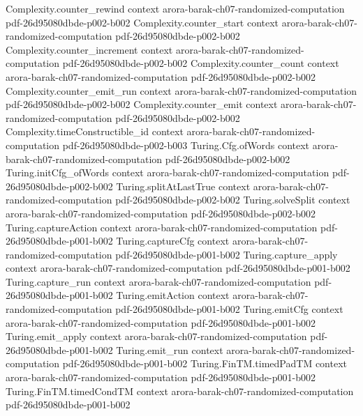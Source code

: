 \begin{theorem}
  {Complexity.counter_rewind}
  {context}
  {arora-barak-ch07-randomized-computation}
  {pdf-26d95080dbde-p002-b002}
\proofstep
  {Complexity.counter_start}
  {context}
  {arora-barak-ch07-randomized-computation}
  {pdf-26d95080dbde-p002-b002}
\proofstep
  {Complexity.counter_increment}
  {context}
  {arora-barak-ch07-randomized-computation}
  {pdf-26d95080dbde-p002-b002}
\proofstep
  {Complexity.counter_count}
  {context}
  {arora-barak-ch07-randomized-computation}
  {pdf-26d95080dbde-p002-b002}
\proofstep
  {Complexity.counter_emit_run}
  {context}
  {arora-barak-ch07-randomized-computation}
  {pdf-26d95080dbde-p002-b002}
\proofstep
  {Complexity.counter_emit}
  {context}
  {arora-barak-ch07-randomized-computation}
  {pdf-26d95080dbde-p002-b002}
\proofstep
  {Complexity.timeConstructible_id}
  {context}
  {arora-barak-ch07-randomized-computation}
  {pdf-26d95080dbde-p002-b003}
\proofstep
  {Turing.Cfg.ofWords}
  {context}
  {arora-barak-ch07-randomized-computation}
  {pdf-26d95080dbde-p002-b002}
\proofstep
  {Turing.initCfg_ofWords}
  {context}
  {arora-barak-ch07-randomized-computation}
  {pdf-26d95080dbde-p002-b002}
\proofstep
  {Turing.splitAtLastTrue}
  {context}
  {arora-barak-ch07-randomized-computation}
  {pdf-26d95080dbde-p002-b002}
\proofstep
  {Turing.solveSplit}
  {context}
  {arora-barak-ch07-randomized-computation}
  {pdf-26d95080dbde-p002-b002}
\proofstep
  {Turing.captureAction}
  {context}
  {arora-barak-ch07-randomized-computation}
  {pdf-26d95080dbde-p001-b002}
\proofstep
  {Turing.captureCfg}
  {context}
  {arora-barak-ch07-randomized-computation}
  {pdf-26d95080dbde-p001-b002}
\proofstep
  {Turing.capture_apply}
  {context}
  {arora-barak-ch07-randomized-computation}
  {pdf-26d95080dbde-p001-b002}
\proofstep
  {Turing.capture_run}
  {context}
  {arora-barak-ch07-randomized-computation}
  {pdf-26d95080dbde-p001-b002}
\proofstep
  {Turing.emitAction}
  {context}
  {arora-barak-ch07-randomized-computation}
  {pdf-26d95080dbde-p001-b002}
\proofstep
  {Turing.emitCfg}
  {context}
  {arora-barak-ch07-randomized-computation}
  {pdf-26d95080dbde-p001-b002}
\proofstep
  {Turing.emit_apply}
  {context}
  {arora-barak-ch07-randomized-computation}
  {pdf-26d95080dbde-p001-b002}
\proofstep
  {Turing.emit_run}
  {context}
  {arora-barak-ch07-randomized-computation}
  {pdf-26d95080dbde-p001-b002}
\proofstep
  {Turing.FinTM.timedPadTM}
  {context}
  {arora-barak-ch07-randomized-computation}
  {pdf-26d95080dbde-p001-b002}
\proofstep
  {Turing.FinTM.timedCondTM}
  {context}
  {arora-barak-ch07-randomized-computation}
  {pdf-26d95080dbde-p001-b002}
\proofstep

\end{theorem}
